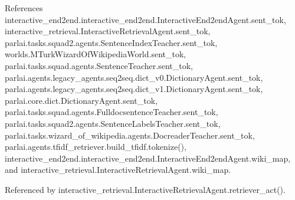 References interactive\+\_\+end2end.\+interactive\+\_\+end2end.\+Interactive\+End2end\+Agent.\+sent\+\_\+tok, interactive\+\_\+retrieval.\+Interactive\+Retrieval\+Agent.\+sent\+\_\+tok, parlai.\+tasks.\+squad2.\+agents.\+Sentence\+Index\+Teacher.\+sent\+\_\+tok, worlds.\+M\+Turk\+Wizard\+Of\+Wikipedia\+World.\+sent\+\_\+tok, parlai.\+tasks.\+squad.\+agents.\+Sentence\+Teacher.\+sent\+\_\+tok, parlai.\+agents.\+legacy\+\_\+agents.\+seq2seq.\+dict\+\_\+v0.\+Dictionary\+Agent.\+sent\+\_\+tok, parlai.\+agents.\+legacy\+\_\+agents.\+seq2seq.\+dict\+\_\+v1.\+Dictionary\+Agent.\+sent\+\_\+tok, parlai.\+core.\+dict.\+Dictionary\+Agent.\+sent\+\_\+tok, parlai.\+tasks.\+squad.\+agents.\+Fulldocsentence\+Teacher.\+sent\+\_\+tok, parlai.\+tasks.\+squad2.\+agents.\+Sentence\+Labels\+Teacher.\+sent\+\_\+tok, parlai.\+tasks.\+wizard\+\_\+of\+\_\+wikipedia.\+agents.\+Docreader\+Teacher.\+sent\+\_\+tok, parlai.\+agents.\+tfidf\+\_\+retriever.\+build\+\_\+tfidf.\+tokenize(), interactive\+\_\+end2end.\+interactive\+\_\+end2end.\+Interactive\+End2end\+Agent.\+wiki\+\_\+map, and interactive\+\_\+retrieval.\+Interactive\+Retrieval\+Agent.\+wiki\+\_\+map.



Referenced by interactive\+\_\+retrieval.\+Interactive\+Retrieval\+Agent.\+retriever\+\_\+act().

